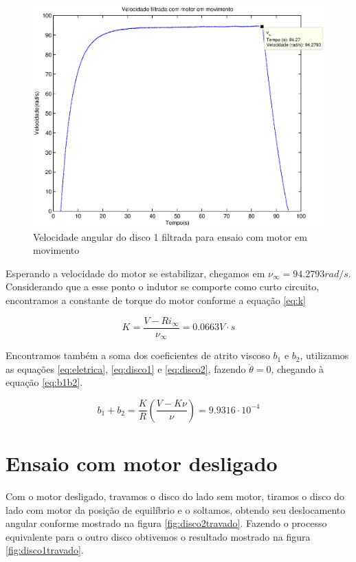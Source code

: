 \documentclass{article}
\begin{document}
\begin{figure}[H]
	\centering
	\includegraphics[width=0.8\linewidth]{../ensaiorvF}
	\caption{Velocidade angular do disco 1 filtrada para ensaio com motor em movimento}
	\label{fig:ensaiorvF}
\end{figure}

Esperando a velocidade do motor se estabilizar, chegamos em $\nu_{\infty}=94.2793rad/s$. Considerando que a esse ponto o indutor se comporte como curto circuito, encontramos a constante de torque do motor conforme a equação \ref{eq:k}

\begin{equation}
\label{eq:k}
K=\frac{V-Ri_{\infty}}{\nu_{\infty}}=0.0663 V\cdot s
\end{equation}

Encontramos também a soma dos coeficientes de atrito viscoso $b_1$ e $b_2$, utilizamos as equações \ref{eq:eletrica}, \ref{eq:disco1} e \ref{eq:disco2}, fazendo $\ddot{\theta}=0$, chegando à equação \ref{eq:b1b2}.

\begin{equation}
\label{eq:b1b2}
b_1+b_2=\frac{K}{R}\left(\frac{V-K\nu}{\nu}\right)=9.9316\cdot10^{-4}
\end{equation}

\section{Ensaio com motor desligado}
Com o motor desligado, travamos o disco do lado sem motor, tiramos o disco do lado com motor da posição de equilíbrio e o soltamos, obtendo seu deslocamento angular conforme mostrado na figura \ref{fig:disco2travado}. Fazendo o processo equivalente para o outro disco obtivemos o resultado mostrado na figura \ref{fig:disco1travado}.
\end{document}
